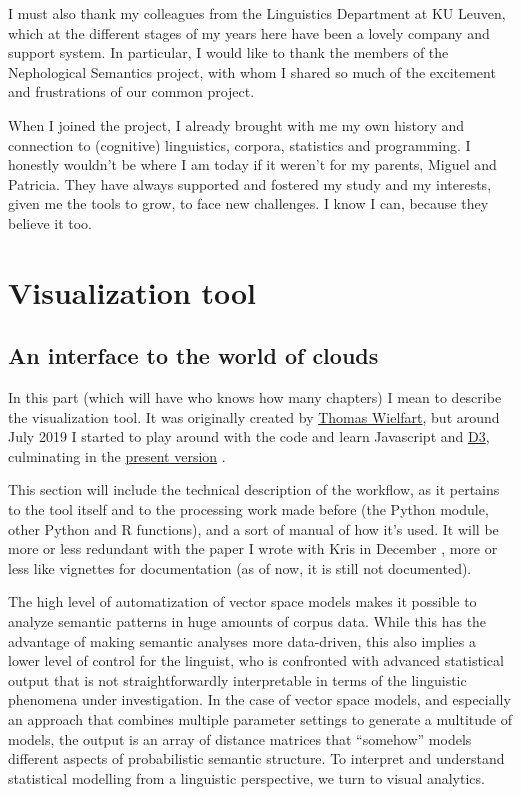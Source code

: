\documentclass[
]{book}
\begin{document}
I must also thank my colleagues from the Linguistics Department at KU Leuven,
which at the different stages of my years here have been a lovely company and
support system. In particular, I would like to thank the members of the
Nephological Semantics project, with whom I shared so much of the excitement and
frustrations of our common project.

When I joined the project, I already brought with me my own history and connection
to (cognitive) linguistics, corpora, statistics and programming. I honestly wouldn't
be where I am today if it weren't for my parents, Miguel and Patricia. They have
always supported and fostered my study and my interests, given me the tools to
grow, to face new challenges. I know I can, because they believe it too.

\hypertarget{part-visualization-tool}{%
\part{Visualization tool}\label{part-visualization-tool}}

\hypertarget{an-interface-to-the-world-of-clouds}{%
\chapter{An interface to the world of clouds}\label{an-interface-to-the-world-of-clouds}}

In this part (which will have who knows how many chapters) I mean to describe
the visualization tool. It was originally created by \href{https://github.com/tokenclouds/tokenclouds.github.io}{Thomas Wielfart},
but around July 2019 I started to play around with the code and learn Javascript
and \href{https://d3js.org}{D3}, culminating in the \href{https://github.com/qlvl/NephoVis}{present version} \autocite{montes.qlvl_2021}.

This section will include the technical description of the workflow, as it pertains
to the tool itself and to the processing work made before (the Python module, other
Python and R functions), and a sort of manual of how it's used. It will be more or less
redundant with the paper I wrote with Kris in December \autocite{montes.heylen_Submitted},
more or less like vignettes for documentation (as of now, it is still not documented).

The high level of automatization of vector space models makes it possible to analyze semantic patterns in huge amounts of corpus data. While this has the advantage of making semantic analyses more data-driven, this also implies a lower level of control for the linguist, who is confronted with advanced statistical output that is not straightforwardly interpretable in terms of the linguistic phenomena under investigation. In the case of vector space models, and especially an approach that combines multiple parameter settings to generate a multitude of models, the output is an array of distance matrices that ``somehow'' models different aspects of probabilistic semantic structure. To interpret and understand statistical modelling from a linguistic perspective, we turn to visual analytics.
\end{document}
